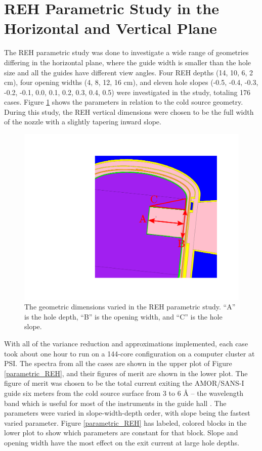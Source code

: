 \documentclass[preprint,12pt]{elsarticle}
\begin{document}
\section{REH Parametric Study in the Horizontal and Vertical Plane}

The REH parametric study was done to investigate a wide range of geometries differing in the horizontal plane, where the guide width is smaller than the hole size and all the guides have different view angles.  Four REH depths (14, 10, 6, 2 cm), four opening widths (4, 8, 12, 16 cm), and eleven hole slopes (-0.5, -0.4, -0.3, -0.2, -0.1, 0.0, 0.1, 0.2, 0.3, 0.4, 0.5) were investigated in the study, totaling 176 cases. Figure \ref{parametric_geom} shows the parameters in relation to the cold source geometry.  During this study, the REH vertical dimensions were chosen to be the full width of the nozzle with a slightly tapering inward slope.

\begin{figure}[h]
\begin{center}
\includegraphics[scale=0.4,trim={13cm 6cm 4cm 5cm},clip]{graphics/para_geom.pdf}
\end{center}
\caption{\label{parametric_geom}The geometric dimensions varied in the REH parametric study. ``A'' is the hole depth, ``B'' is the opening width, and ``C'' is the hole slope.}
\end{figure}

With all of the variance reduction and approximations implemented, each case took about one hour to run on a 144-core configuration on a computer cluster at PSI.  The spectra from all the cases are shown in the upper plot of Figure \ref{parametric_REH}, and their figures of merit are shown in the lower plot.  The figure of merit was chosen to be the total current exiting the AMOR/SANS-I guide six meters from the cold source surface from 3 to 6 \AA{} -- the wavelength band which is useful for most of the instruments in the guide hall \cite{instruments_wavelength}.  The parameters were varied in slope-width-depth order, with slope being the fastest varied parameter. Figure \ref{parametric_REH} has labeled, colored blocks in the lower plot to show which parameters are constant for that block.  Slope and opening width have the most effect on the exit current at large hole depths.
\end{document}
